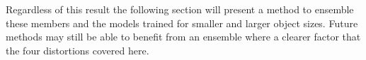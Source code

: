 Regardless of this result the following section will present a method to ensemble these members and the models trained for smaller and larger object sizes. Future methods may still be able to benefit from an ensemble where a clearer factor that the four distortions covered here.

